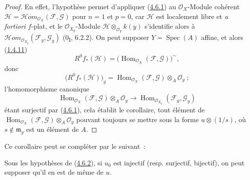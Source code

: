 \begin{proof}
En effet, l'hypothèse permet d'appliquer (\hyperref[III.4.6.1-fr]{4.6.1}) au
$\mathcal O_X$-Module cohérent
$\mathcal H=\mathcal{H}\!om_{\mathcal O_X}(\mathcal F,\mathcal G)$ pour
$n=1$ et $p=0$, car $\mathcal H$ est localement libre et \emph{a fortiori}
$f$-plat, et le $\mathcal O_{X_y}$-Module
$\mathcal H\otimes_{\mathcal O_Y}k(y)$ s'identifie alors à
$\mathcal{H}\!om_{\mathcal O_{X_y}}(\mathcal F_y,\mathcal G_y)$
(0\textsubscript{I}, 6.2.2). On peut supposer $Y=\operatorname{Spec}(A)$
affine, et alors (\hyperref[III.1.4.11-fr]{1.4.11})
\[
R^0f_*(\mathcal H)=
\bigl(\operatorname{Hom}_{\mathcal O_X}(\mathcal F,\mathcal G)\bigr)^\sim,
\]
donc
\[
\bigl(R^0f_*(\mathcal H)\bigr)_y
=\operatorname{Hom}_{\mathcal O_X}(\mathcal F,\mathcal G)
\otimes_A\mathcal O_y~;
\]
l'homomorphisme canonique
\[
\operatorname{Hom}_{\mathcal O_X}(\mathcal F,\mathcal G)
\otimes_A\mathcal O_y
\longrightarrow
\operatorname{Hom}_{\mathcal O_{X_y}}(\mathcal F_y,\mathcal G_y)
\]
étant surjectif par (\hyperref[III.4.6.1-fr]{4.6.1}), cela établit le
corollaire, tout élément de
$\operatorname{Hom}_{\mathcal O_X}(\mathcal F,\mathcal G)
\otimes_A\mathcal O_y$ pouvant toujours se mettre sous la forme
$u\otimes(1/s)$, où $s\notin\mathfrak m_y$ est un élément de $A$.
\end{proof}

Ce corollaire peut se compléter par le suivant~:

\begin{corollary}[4.6.3]
\label{III.4.6.3-fr}
Sous les hypothèses de (\hyperref[III.4.6.2-fr]{4.6.2}), si $u_0$ est
injectif (resp. surjectif, bijectif), on peut supposer qu'il en est de même de
$u$.
\end{corollary}

